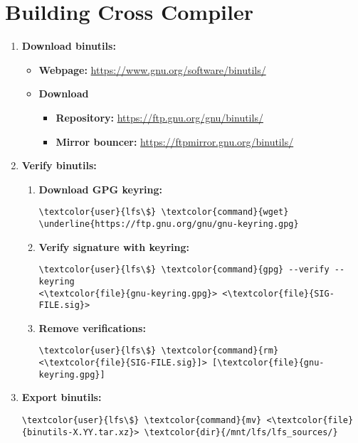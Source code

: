\documentclass[10pt, a4paper, onecolumn, oneside, titlepage, openany]{book}
\begin{document}
\section{Building Cross Compiler}
\begin{enumerate}
    \item \textbf{Download binutils:}
    \begin{itemize}
        \item \textbf{Webpage:} \url{https://www.gnu.org/software/binutils/}
        \item \textbf{Download}
        \begin{itemize}
            \item \textbf{Repository:} \url{https://ftp.gnu.org/gnu/binutils/}
            \item \textbf{Mirror bouncer:} \url{https://ftpmirror.gnu.org/binutils/}
        \end{itemize}
    \end{itemize}
    \item \textbf{Verify binutils:}
    \begin{enumerate}
        \item \textbf{Download GPG keyring:}
\begin{Verbatim}[commandchars=\\\{\}]
\textcolor{user}{lfs\$} \textcolor{command}{wget} \underline{https://ftp.gnu.org/gnu/gnu-keyring.gpg}
\end{Verbatim}
        \item \textbf{Verify signature with keyring:}
\begin{Verbatim}[commandchars=\\\{\}]
\textcolor{user}{lfs\$} \textcolor{command}{gpg} --verify --keyring
<\textcolor{file}{gnu-keyring.gpg}> <\textcolor{file}{SIG-FILE.sig}>
\end{Verbatim}
        \item \textbf{Remove verifications:}
\begin{Verbatim}[commandchars=\\\{\}]
\textcolor{user}{lfs\$} \textcolor{command}{rm} <\textcolor{file}{SIG-FILE.sig}]> [\textcolor{file}{gnu-keyring.gpg}]
\end{Verbatim}
    \end{enumerate}
    \item \textbf{Export binutils:}
\begin{Verbatim}[commandchars=\\\{\}]
\textcolor{user}{lfs\$} \textcolor{command}{mv} <\textcolor{file}{binutils-X.YY.tar.xz}> \textcolor{dir}{/mnt/lfs/lfs_sources/}

\end{Verbatim}
\end{enumerate}
\end{document}

